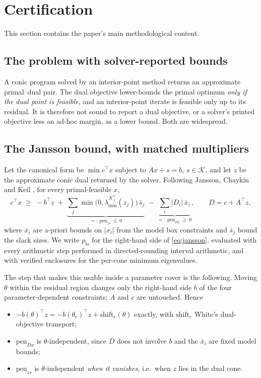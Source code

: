 \documentclass[11pt]{article}
\theoremstyle{definition}
\begin{document}
\section{Certification}\label{sec:cert}

This section contains the paper's main methodological content.

\subsection{The problem with solver-reported bounds}

A conic program solved by an interior-point method returns an
approximate primal--dual pair. The dual objective lower-bounds the
primal optimum \emph{only if the dual point is feasible}, and an
interior-point iterate is feasible only up to its residual. It is
therefore not sound to report a dual objective, or a solver's printed
objective less an ad-hoc margin, as a lower bound. Both are widespread.

\subsection{The Jansson bound, with matched multipliers}

Let the canonical form be $\min c^\top x$ subject to $Ax + s = b$,
$s \in \mathcal{K}$, and let $z$ be the approximate conic dual returned
by the solver. Following Jansson, Chaykin and Keil \cite{JCK2007}, for
every primal-feasible $x$,
\begin{equation}\label{eq:jansson}
  c^\top x \;\ge\; -b^\top z \;+\; \underbrace{\textstyle\sum_j
    \min\bigl(0,\lambda_{\min}^{\mathcal{K}_j^*}(z_j)\bigr)\,
    \bar s_j}_{=:\ \mathrm{pen}_{zs}\ \le\ 0}
  \;-\; \underbrace{\textstyle\sum_i |D_i|\,\bar x_i}_{=:\
    \mathrm{pen}_{Dx}\ \ge\ 0},
  \qquad D = c + A^\top z,
\end{equation}
where $\bar x_i$ are a-priori bounds on $|x_i|$ from the model box
constraints and $\bar s_j$ bound the slack sizes. We write $p_{\mathrm{lo}}$
for the right-hand side of \eqref{eq:jansson}, evaluated with every
arithmetic step performed in directed-rounding interval arithmetic, and
with verified enclosures for the per-cone minimum eigenvalues.

The step that makes this usable inside a parameter cover is the
following. Moving $\theta$ within the residual region changes only the
right-hand side $b$ of the four parameter-dependent constraints; $A$ and
$c$ are untouched. Hence
\begin{itemize}
\item $-b(\theta)^\top z = -b(\theta_c)^\top z + \mathrm{shift}_c(\theta)$
  exactly, with $\mathrm{shift}_c$ White's dual-objective transport;
\item $\mathrm{pen}_{Dx}$ is $\theta$-independent, since $D$ does not
  involve $b$ and the $\bar x_i$ are fixed model bounds;
\item $\mathrm{pen}_{zs}$ is $\theta$-independent \emph{when it
  vanishes}, i.e.\ when $z$ lies in the dual cone.
\end{itemize}
\end{document}
